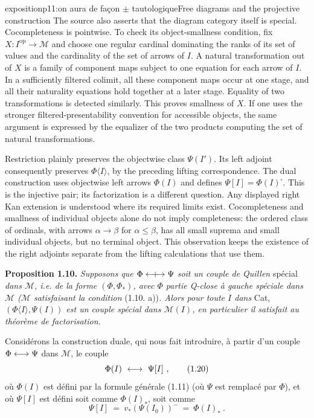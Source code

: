 \begin{dcomment}{exposition}{p11:on aura de façon $\pm$ tautologique}{Free diagrams and the projective construction}
The source also asserts that the diagram category itself is special. Cocompleteness is pointwise. To check its object-smallness condition, fix $X:I^{\mathrm{op}}\to\mathcal M$ and choose one regular cardinal dominating the ranks of its set of values and the cardinality of the set of arrows of $I$. A natural transformation out of $X$ is a family of component maps subject to one equation for each arrow of $I$. In a sufficiently filtered colimit, all these component maps occur at one stage, and all their naturality equations hold together at a later stage. Equality of two transformations is detected similarly. This proves smallness of $X$. If one uses the stronger filtered-presentability convention for accessible objects, the same argument is expressed by the equalizer of the two products computing the set of natural transformations.

Restriction plainly preserves the objectwise class $\Psi(I')$. Its left adjoint consequently preserves $\Phi\langle I\rangle$, by the preceding lifting correspondence. The dual construction uses objectwise left arrows $\Phi(I)$ and defines $\Psi[I]=\Phi(I)^{\square}$. This is the injective pair; its factorization is a different question. Any displayed right Kan extension is understood where its required limits exist. Cocompleteness and smallness of individual objects alone do not imply completeness: the ordered class of ordinals, with arrows $\alpha\to\beta$ for $\alpha\leq\beta$, has all small suprema and small individual objects, but no terminal object. This observation keeps the existence of the right adjoints separate from the lifting calculations that use them.
\end{dcomment}


\textbf{Proposition 1.10.} \textit{Supposons que $\Phi \mathrel{\leftarrow\mkern-9mu{+}\mkern-9mu\rightarrow} \Psi$ soit un couple de Quillen} spécial \textit{dans $\mathcal{M}$, i.e. de la forme $(\Phi, \Phi_{*})$, avec $\Phi$ partie Q-close à gauche spéciale dans $\mathcal{M}$ ($\mathcal{M}$ satisfaisant la condition} (1.10. a))\textit{. Alors pour toute $I$ dans} Cat, \textit{$(\Phi\langle I\rangle, \Psi(I))$ est un couple spécial dans $\mathcal{M}(I)$, en particulier il satisfait au théorème de factorisation.}

Considérons la construction duale, qui nous fait introduire, à partir d'un couple $\Phi \longleftrightarrow \Psi$ dans $\mathcal{M}$, le couple
\[
\Phi(I) \ \clos\ \Psi[I]\ , \tag*{(1.20)}
\]
où $\Phi(I)$ est défini par la formule générale (1.11) (où $\Psi$ est remplacé par $\Phi$), et où $\Psi[I]$ est défini soit comme $\Phi(I)_{*}$, soit comme
\[
\Psi[I] \ =\ v_{*}(\Psi(I_0))^{-} \ =\ \Phi(I)_{*}\ . \tag*{(1.21)}
\]

